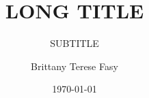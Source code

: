 \documentclass{beamer}
\title[SHORT]{LONG TITLE}
\subtitle{SUBTITLE}
\author[B.\ Fasy]{Brittany Terese Fasy}
\institute[MSU]{Gianforte School of Computing, Montana State University}
\date{\today}
\begin{document}
\begin{frame}
\titlepage
\end{frame}

%
\end{document}
